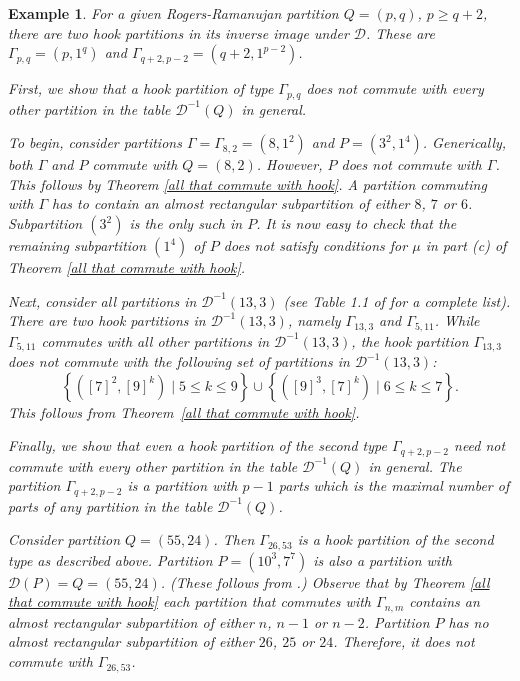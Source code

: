 \documentclass[11pt]{amsproc}
\newtheorem{exmp}[thm]{Example}
\newcommand{\D}{\mathcal{D}}
\begin{document}
\begin{exmp}\label{example.5}
    For a given Rogers-Ramanujan partition $Q=(p,q)$, $p\ge q+2$, there are two hook partitions in its inverse image under $\D$. These are $\Gamma_{p,q}=(p,1^q)$ and $\Gamma_{q+2,p-2} = (q+2,1^{p-2})$. 
    
First, we show that a hook partition of type $\Gamma_{p,q}$ does not commute with every other partition in the table $\D^{-1}(Q)$ in general.    

To begin, consider partitions $\Gamma=\Gamma_{8,2} =(8,1^2)$ and $P=(3^2,1^4)$. Generically, both $\Gamma$ and $P$ commute with $Q=(8,2)$. However, $P$ does not commute with $\Gamma$. This follows by Theorem \ref{all that commute with hook}. A partition commuting with $\Gamma$ has to contain an almost rectangular subpartition of either $8$, $7$ or $6$. Subpartition $(3^2)$ is the only such in $P$. It is now easy to check that the remaining subpartition $(1^4)$ of $P$ does not satisfy conditions for $\mu$ in part (c) of Theorem \ref{all that commute with hook}.

Next, consider all partitions in $\mathcal{D}^{-1}(13,3)$ (see Table 1.1 of \cite{IKvSZ} for a complete list). There are two hook partitions in $\mathcal{D}^{-1}(13,3)$, namely $\Gamma_{13,3}$ and $\Gamma_{5,11}$. While $\Gamma_{5,11}$ commutes with all other partitions in $\mathcal{D}^{-1}(13,3)$, the hook partition $\Gamma_{13,3}$ does not commute with the following set of partitions in $\mathcal{D}^{-1}(13,3)$:
    $$\left\{([7]^2,[9]^k)\mid 5\leq k \leq 9\right \}\cup \left\{([9]^3,[7]^k)\mid 6\leq k \leq 7\right\}.$$
This follows from Theorem~\ref{all that commute with hook}.

 Finally, we show that even a hook partition of the second type $\Gamma_{q+2,p-2}$ need not commute with every other partition in the table $\D^{-1}(Q)$ in general. The partition $\Gamma_{q+2,p-2}$ is a partition with $p-1$ parts which is the maximal number of parts of any partition in the table $\D^{-1}(Q)$.

    Consider partition $Q=(55,24)$. Then $\Gamma_{26,53}$ is a hook partition of the second type as described above. Partition $P=(10^3,7^7)$ is also a partition with $\D(P)=Q=(55,24)$. (These follows from \cite[Thm. 13]{Obl-1}.) Observe that by Theorem \ref{all that commute with hook} each partition that commutes with $\Gamma_{n,m}$ contains an almost rectangular subpartition of either $n$, $n-1$ or $n-2$. Partition $P$ has no almost rectangular subpartition of either $26$, $25$ or $24$. Therefore, it does not commute with $\Gamma_{26,53}$.
\end{exmp}
    
\end{document}
